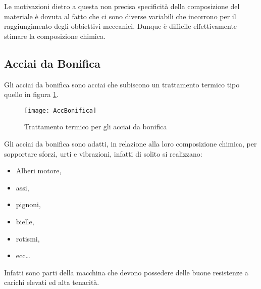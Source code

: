 Le motivazioni dietro a questa non precisa specificità della composizione
del materiale è dovuta al fatto che ci sono diverse variabili che incorrono 
per il raggiungimento degli obbiettivi meccanici.
Dunque è difficile effettivamente stimare la composizione chimica.

\subsection{Acciai da Bonifica}
Gli acciai da bonifica sono acciai che subiscono un trattamento termico
tipo quello in figura \ref{fig:AccBonifica}.

\begin{figure}
\centering
\texttt{[image: AccBonifica]}
\caption{Trattamento termico per gli acciai da bonifica}
\label{fig:AccBonifica}
\end{figure}

Gli acciai da bonifica sono adatti, in relazione alla loro composizione 
chimica, per sopportare sforzi, urti e vibrazioni, infatti di solito
si realizzano:
\begin{itemize}
\item Alberi motore,
\item assi,
\item pignoni,
\item bielle,
\item rotismi,
\item ecc\dots
\end{itemize}
Infatti sono parti della macchina che devono possedere delle buone
resistenze a carichi elevati ed alta tenacità.